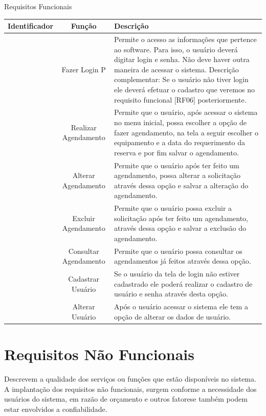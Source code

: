 \documentclass[
	12pt,				%
	openright,			%
	twoside,			%
	a4paper,			%
	english,			%
	french,				%
	spanish,			%
	brazil				%
	]{abntex2}
\begin{document}
\begin{quadro}[htb]
	\centering
	\caption{\label{quadro_RF}Requisitos Funcionais}
	\begin{tabular}{|c|c|>{\centering\arraybackslash}p{9cm}|}
		\hline
		\textbf{Identificador} & \textbf{Função} & \textbf{Descrição}\\ \hline
		[RF01] & Fazer Login P          & Permite o acesso as informações que
		pertence ao software. Para isso, o usuário
		deverá digitar login e senha. Não deve haver
		outra maneira de acessar o sistema.
		Descrição complementar: Se o usuário não
		tiver login ele deverá efetuar o cadastro que
		veremos no requisito funcional [RF06]
		posteriormente. \\ \hline
		[RF02] & Realizar Agendamento   & Permite que o usuário, após acessar o
		sistema no menu inicial, possa escolher a
		opção de fazer agendamento, na tela a seguir
		escolher o equipamento e a data do
		requerimento da reserva e por fim salvar o
		agendamento. \\ \hline
		[RF03] & Alterar Agendamento    & Permite que o usuário após ter feito um
		agendamento, possa alterar a solicitação
		através dessa opção e salvar a alteração do
		agendamento. \\ \hline
		[RF04] & Excluir Agendamento    & Permite que o usuário possa excluir a
		solicitação após ter feito um agendamento,
		através dessa opção e salvar a exclusão do
		agendamento. \\ \hline
		[RF05] & Consultar Agendamento  & Permite que o usuário possa consultar os
		agendamentos já feitos através dessa opção. \\ \hline
		[RF06] & Cadastrar Usuário      & Se o usuário da tela de login não estiver
		cadastrado ele poderá realizar o cadastro de
		usuário e senha através desta opção. \\ \hline
		[RF07] & Alterar Usuário        & Após o usuário acessar o sistema ele tem a
		opção de alterar os dados de usuário. \\ \hline
	\end{tabular}
\end{quadro}

\section*{Requisitos Não Funcionais}

Descrevem a qualidade dos serviços ou funções que estão disponíveis no
sistema. A implantação dos requisitos não funcionais, surgem conforme a
necessidade dos usuários do sistema, em razão de orçamento e outros fatorese
também podem estar envolvidos a confiabilidade.
\end{document}
